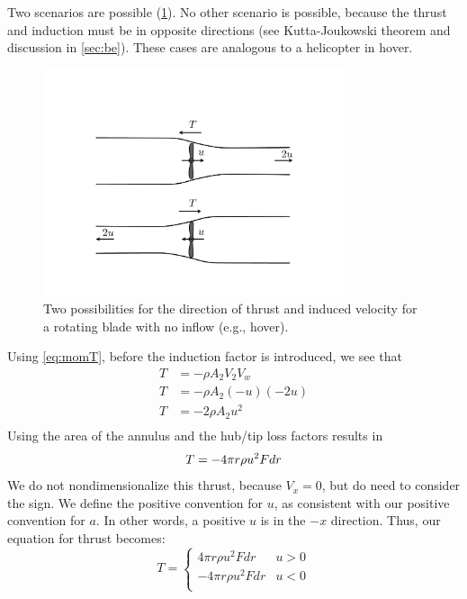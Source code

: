 \documentclass{article}
\begin{document}
Two scenarios are possible (\cref{fig:velocity-deficit2}).  No other scenario is possible, because the thrust and induction must be in opposite directions (see Kutta-Joukowski theorem and discussion in \cref{sec:be}).  These cases are analogous to a helicopter in hover.
\begin{figure}[htbp]
\centering
\includegraphics[width=3.5in]{figures/velocity-deficit2}
\caption{Two possibilities for the direction of thrust and induced velocity for a rotating blade with no inflow (e.g., hover).}
\label{fig:velocity-deficit2}
\end{figure}

Using \cref{eq:momT}, before the induction factor is introduced, we see that
\begin{equation}
    \begin{aligned}
        T &= -\rho A_2 V_2 V_w\\
        T &= -\rho A_2 (-u) (-2u)\\
        T &= - 2 \rho A_2 u^2\\
    \end{aligned}
\end{equation}
Using the area of the annulus and the hub/tip loss factors results in
\begin{equation}
    T = - 4 \pi r \rho u^2 F dr\\
\end{equation}
We do not nondimensionalize this thrust, because $V_x = 0$, but do need to consider the sign.  We define the positive convention for $u$, as consistent with our positive convention for $a$.  In other words, a positive $u$ is in the $-x$ direction.  Thus, our equation for thrust becomes:
\begin{equation}
    T =
    \begin{cases}
    4 \pi r \rho u^2 F dr & u > 0\\
    -4 \pi r \rho u^2 F dr & u < 0\\
    \end{cases}
\end{equation}
\end{document}
